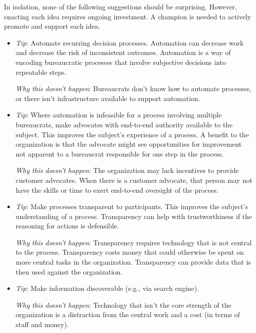 In isolation, none of the following suggestions should be surprising. However, enacting each idea requires ongoing investment. A champion is needed to actively promote and support each idea.
\begin{itemize}
    \item \textit{Tip}: Automate recurring decision processes. Automation can decrease work and decrease the risk of inconsistent outcomes. Automation is a way of encoding bureaucratic processes that involve subjective decisions into repeatable steps.
    
    \textit{Why this doesn't happen}: Bureaucrats don't know how to automate processes, or there isn't infrastructure available to support automation. 

    \item \textit{Tip}: Where automation is infeasible for a process involving multiple bureaucrats, make advocates with end-to-end authority available to the subject. 
This improves the subject's experience of a process. A benefit to the organization is that the advocate might see opportunities for improvement not apparent to a bureaucrat responsible for one step in the process.

    \textit{Why this doesn't happen}: The organization may lack incentives to provide customer advocates. When there is a customer advocate, that person may not have the skills or time to exert end-to-end oversight of the process.

    \item \textit{Tip}: Make processes transparent to participants. 
This improves the subject's understanding of a process. Transparency can help with trustworthiness if the reasoning for actions is defensible.

    \textit{Why this doesn't happen}: Transparency requires technology that is not central to the process. Transparency costs money that could otherwise be spent on more central tasks in the organization. Transparency can provide data that is then used against the organization. 

    \item \textit{Tip}: Make information discoverable (e.g., via search engine).

    \textit{Why this doesn't happen}: Technology that isn't the core strength of the organization is a distraction from the central work and a cost (in terms of staff and money).
    

\end{itemize}
